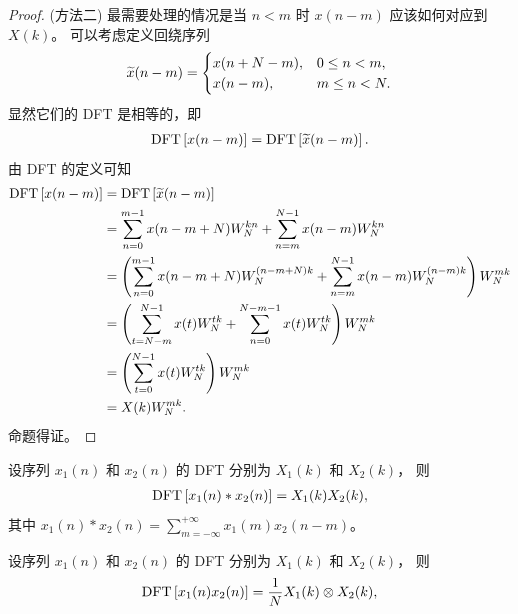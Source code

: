 \begin{proof}
    (方法二)
    最需要处理的情况是当 $n < m$ 时 $x(n - m)$ 应该如何对应到 $X(k)$。
    可以考虑定义回绕序列
    \begin{align*}
        \widetilde{x}(n - m) = \begin{cases}
            x(n + N - m), & 0 \le n < m, \\
            x(n - m), & m \le n < N.
        \end{cases}
    \end{align*}
    显然它们的 DFT 是相等的，即
    \begin{align*}
        \mathrm{DFT}\left[x(n - m)\right] = \mathrm{DFT}\left[\widetilde{x}(n - m)\right].
    \end{align*}
    由 DFT 的定义可知
    \begin{align*}
        \mathrm{DFT}\left[x(n - m)\right] & = \mathrm{DFT}\left[\widetilde{x}(n - m)\right] \\
        & = \sum_{n = 0}^{m - 1}x(n - m + N)W_N^{kn}
            + \sum_{n = m}^{N - 1}x(n - m)W_N^{kn} \\
        & = \left(\sum_{n = 0}^{m - 1}x(n - m + N)W_N^{(n - m + N)k}
            + \sum_{n = m}^{N - 1}x(n - m)W_N^{(n - m)k}\right)W_N^{mk} \\
        & = \left(\sum_{t = N - m}^{N - 1}x(t)W_N^{tk}
            + \sum_{n = 0}^{N - m - 1}x(t)W_N^{tk}\right)W_N^{mk} \\
        & = \left(\sum_{t = 0}^{N - 1}x(t)W_N^{tk}\right)W_N^{mk} \\
        & = X(k)W_N^{mk}. 
    \end{align*}
    命题得证。
\end{proof}

\begin{property}
    设序列 $x_1(n)$ 和 $x_2(n)$ 的 DFT 分别为 $X_1(k)$ 和 $X_2(k)$，
    则
    \begin{align*}
        \mathrm{DFT}\left[x_1(n) * x_2(n)\right] = X_1(k)X_2(k),
    \end{align*}
    其中 $x_1(n) * x_2(n) = \sum_{m = -\infty}^{+\infty}x_1(m)x_2(n - m)$。
\end{property}

\begin{property}
    设序列 $x_1(n)$ 和 $x_2(n)$ 的 DFT 分别为 $X_1(k)$ 和 $X_2(k)$，
    则
    \begin{align*}
        \mathrm{DFT}\left[x_1(n)x_2(n)\right] = \frac{1}{N}X_1(k) \otimes X_2(k),
    \end{align*}
\end{property}


